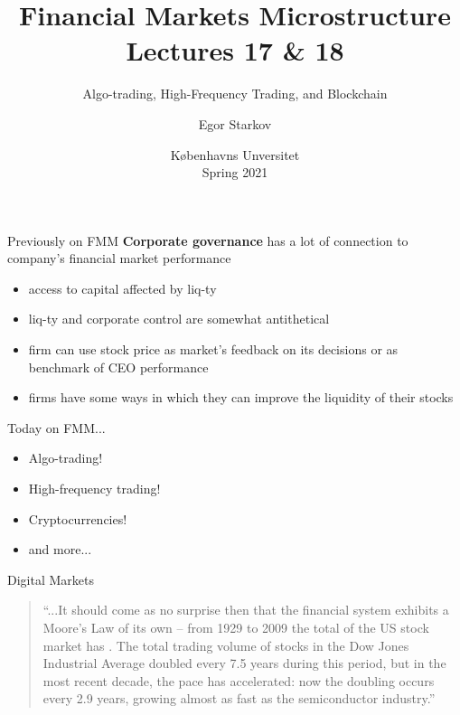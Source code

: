 \documentclass[english,10pt
,aspectratio=169
]{beamer}
\title{Financial Markets Microstructure \\ Lectures 17 \& 18}
\subtitle{Algo-trading, High-Frequency Trading, and Blockchain}
\author{Egor Starkov}
\date{K{\o}benhavns Unversitet \\
	Spring 2021}
\begin{document}
	\frame[plain]{\titlepage}


\begin{frame}{Previously on FMM}
	\textbf{Corporate governance} has a lot of connection to company's financial market performance
	\begin{itemize}
		\item access to capital affected by liq-ty
		\item liq-ty and corporate control are somewhat antithetical
		\item firm can use stock price as market's feedback on its decisions or as benchmark of CEO performance
		\item firms have some ways in which they can improve the liquidity of their stocks
	\end{itemize}
\end{frame}


\begin{frame}{Today on FMM...}
	\begin{itemize}
		\item Algo-trading!
		\item High-frequency trading!
		\item Cryptocurrencies!
		\item and more...
	\end{itemize}
\end{frame}




\begin{frame}{Digital Markets}
	\begin{quotation}
		``...It should come as no surprise then that the financial system exhibits a Moore's Law of its own -- from 1929 to 2009 the total  of the US stock market has . The total \alert{trading volume} of stocks in the Dow Jones Industrial Average \alert{doubled every 7.5 years} during this period, but in the most recent decade, the \alert{pace has accelerated}: now the doubling occurs every 2.9 years, growing almost as fast as the semiconductor industry.''
		\begin{flushright}
			\cite{kirilenko_moores_2013}
		\end{flushright}
	\end{quotation}
\end{frame}
\end{document}
